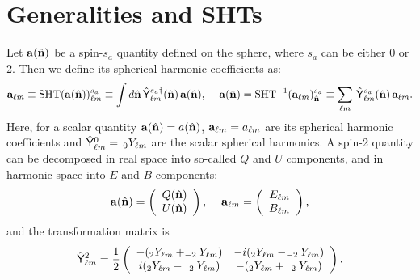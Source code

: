 \documentclass[a4paper,10pt]{article}
\newcommand{\nv}{\hat{\bf n}}
\begin{document}
\section{Generalities and SHTs}
Let ${\bf a}(\nv)$ be a spin-$s_a$ quantity defined on the sphere, where $s_a$ can be either 0 or 2. Then we define its spherical harmonic coefficients as:
\begin{equation}
 {\bf a}_{\ell m}\equiv{\rm SHT}({\bf a}(\nv))^{s_a}_{\ell m}\equiv\int d\nv\,\hat{\sf Y}^{s_a\dag}_{\ell m}(\nv)\,{\bf a}(\nv),\hspace{12pt}
 {\bf a}(\nv)={\rm SHT}^{-1}({\bf a}_{\ell m})^{s_a}_{\nv}\equiv\sum_{\ell m}\,\hat{\sf Y}^{s_a}_{\ell m}(\nv)\,{\bf a}_{\ell m}.
\end{equation}
Here, for a scalar quantity ${\bf a}(\nv)=a(\nv)$, ${\bf a}_{\ell m}=a_{\ell m}$ are its spherical harmonic coefficients and $\hat{\sf Y}^0_{\ell m}=\,_0Y_{\ell m}$ are the scalar spherical harmonics. A spin-2 quantity can be decomposed in real space into so-called $Q$ and $U$ components, and in harmonic space into $E$ and $B$ components:
\begin{equation}
  {\bf a}(\nv)=\left(\begin{array}{c}
                      Q(\nv)\\U(\nv)
                     \end{array}
  \right),\hspace{12pt}
  {\bf a}_{\ell m}=\left(\begin{array}{c}
                      E_{\ell m}\\B_{\ell m}
                     \end{array}
  \right),
\end{equation}
and the transformation matrix is
\begin{equation}
  \hat{\sf Y}^2_{\ell m}=\frac{1}{2}\left(\begin{array}{cc}
                             -(_2Y_{\ell m}+_{-2}Y_{\ell m}) & -i(_2Y_{\ell m}-_{-2}Y_{\ell m})\\
                             i(_2Y_{\ell m}-_{-2}Y_{\ell m}) & - (_2Y_{\ell m}+_{-2}Y_{\ell m})\\
                            \end{array}
\right).
\end{equation}
\end{document}
